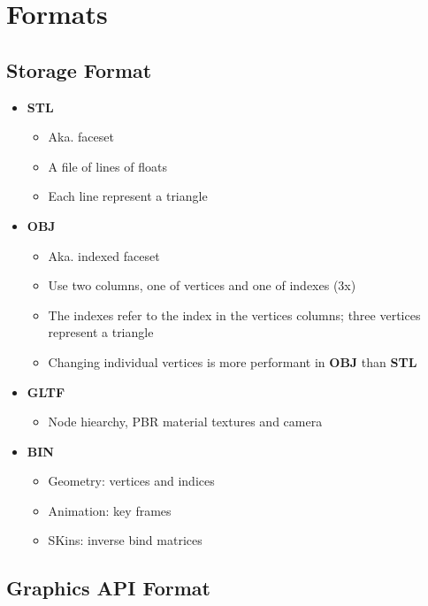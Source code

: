 \section{Formats}

\subsection{Storage Format}

  \begin{itemize}
    \item \textbf{STL}
    \begin{itemize}
      \item Aka. faceset
      \item A file of lines of floats
      \item Each line represent a triangle
    \end{itemize}

    \item \textbf{OBJ}
    \begin{itemize}
      \item Aka. indexed faceset
      \item Use two columns, one of vertices and one of indexes (3x)
      \item The indexes refer to the index in the vertices columns;
      three vertices represent a triangle
      \item Changing individual vertices is more performant in \textbf{OBJ}
      than \textbf{STL}
    \end{itemize}

    \item \textbf{GLTF}
    \begin{itemize}
      \item Node hiearchy, PBR material textures and camera
    \end{itemize}

    \item \textbf{BIN}
    \begin{itemize}
      \item Geometry: vertices and indices
      \item Animation:  key frames
      \item SKins: inverse bind matrices
    \end{itemize}
  \end{itemize}

\subsection{Graphics API Format}

